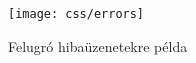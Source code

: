 \begin{figure}[H]
    \centering
    \texttt{[image: css/errors]}
    \caption{Felugró hibaüzenetekre példa}
\end{figure}





















